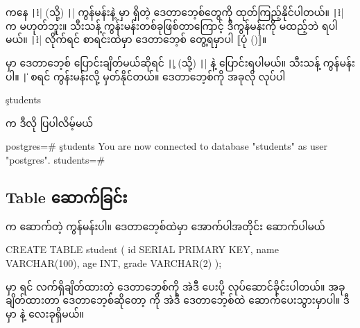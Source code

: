  ကနေ \texttt|\l| (သို့) \texttt|\list| ကွန်မန်းနဲ့  မှာ ရှိတဲ့ ဒေတာဘေ့စ်တွေကို ထုတ်ကြည့်နိုင်ပါတယ်။ \texttt|\l| က  မဟုတ်ဘူး။  သီးသန့် ကွန်းမန်းတစ်ခုဖြစ်တာကြောင့် ဒီကွန်မန်းကို \fCode{;} မထည့်ဘဲ  ရပါမယ်။ \texttt|\l|  လိုက်ရင် စာရင်းထဲမှာ  ဒေတာဘေ့စ် တွေ့ရမှာပါ $\big\llbracket$ပုံ (\fRefNo{\ref{fig:listdb}})$\big\rrbracket$။

\begin{figure}[tb!]
\caption{}
\label{fig:listdb}
\end{figure}

 မှာ ဒေတာဘေ့စ် ပြောင်းချိတ်မယ်ဆိုရင် \texttt|\c| (သို့) \texttt|\connect| နဲ့ ပြောင်းရပါမယ်။  သီးသန့် ကွန်မန်းပါ။ \texttt|\|\fEn{)} စရင်  ကွန်းမန်းလို့ မှတ်နိုင်တယ်။  ဒေတာဘေ့စ်ကို အခုလို  လုပ်ပါ
\begin{codetxt}
\c students
\end{codetxt}
 က ဒီလို ပြပါလိမ့်မယ်
\begin{codetxt}
postgres=# \c students
You are now connected to database "students" as user "postgres".
students=#
\end{codetxt}


\subsection*{Table ဆောက်ခြင်း}
 က  ဆောက်တဲ့  ကွန်မန်းပါ။  ဒေတာဘေ့စ်ထဲမှာ  အောက်ပါအတိုင်း ဆောက်ပါမယ်
%
\begin{sql}
CREATE TABLE student (
    id SERIAL PRIMARY KEY,
    name VARCHAR(100),
    age INT,
    grade VARCHAR(2)
);
\end{sql}
%  
 မှာ   ရင် လက်ရှိချိတ်ထားတဲ့ ဒေတာဘေ့စ်ကို အဲဒီ  ပေးပို့ လုပ်ဆောင်ခိုင်းပါတယ်။ အခုချိတ်ထားတာ  ဒေတာဘေ့စ်ဆိုတော့  ကို အဲဒီ ဒေတာဘေ့စ်ထဲ ဆောက်ပေးသွားမှာပါ။ ဒီ  မှာ \fEn{,} \fEn{,}  နဲ့   လေးခုရှိမယ်။

